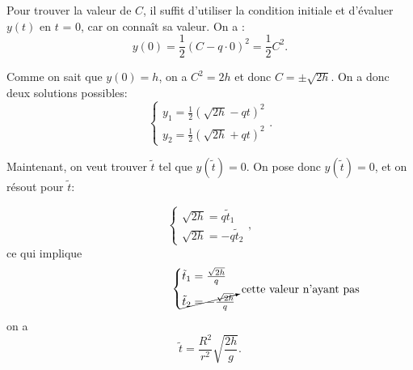 \documentclass{article}
\begin{document}
Pour trouver la valeur de $C$, il suffit d'utiliser la condition initiale et d'évaluer $y(t)$ en $t$ = 0, car on connaît sa valeur. On a : 
\[y(0) = \frac{1}{2}(C - q \cdot 0)^2 = \frac{1}{2}C^2.\]

\noindent Comme on sait que $y(0) = h$, on a $C^2 = 2h$ et donc $C = \pm \sqrt{2h}$. On a donc deux solutions possibles: 
\[\begin{cases}
y_1=\frac{1}{2}\left(\sqrt{2h} - qt\right)^2\\
y_2=\frac{1}{2}\left(\sqrt{2h} + qt\right)^2
\end{cases}.\]

\noindent Maintenant, on veut trouver $\tilde{t}$ tel que $y(\tilde{t}) = 0$. On pose donc $y(\tilde{t}) = 0$, et on résout pour $\tilde{t}$: 


\[ \begin{cases}
\sqrt{2h} = q \tilde{t}_1\\
\sqrt{2h} = -q \tilde{t}_2
\end{cases},\]ce qui implique \[ \begin{cases}
\tilde{t}_1 = \frac{\sqrt{2h}}{q}\\
\cancelto{\mbox{cette valeur n'ayant pas de sens, étant un temps négatif,}}{\tilde{t}_2=- \frac{\sqrt{2h}}{q}}
\end{cases}\]on a\[\boxed{\tilde{t} = \frac{R^2}{r^2} \sqrt{\frac{2h}{g}}.}\]

\end{document}
